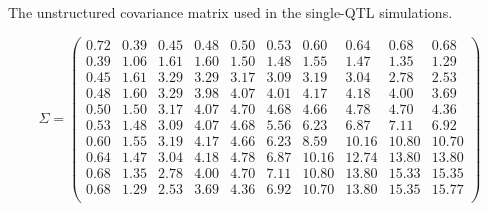 \documentclass[letterpaper,twoside]{article}
\begin{document}
\begin{table}[p]
\centering
  \caption{The unstructured covariance matrix used in the single-QTL simulations.}
\begin{equation*}
  \Sigma = \begin{pmatrix}
0.72 & 0.39 & 0.45 & 0.48 & 0.50 & 0.53 & 0.60 & 0.64 & 0.68 & 0.68 \\
0.39 & 1.06 & 1.61 & 1.60 & 1.50 & 1.48 & 1.55 & 1.47 & 1.35 & 1.29 \\
0.45 & 1.61 & 3.29 & 3.29 & 3.17 & 3.09 & 3.19 & 3.04 & 2.78 & 2.53 \\
0.48 & 1.60 & 3.29 & 3.98 & 4.07 & 4.01 & 4.17 & 4.18 & 4.00 & 3.69 \\
0.50 & 1.50 & 3.17 & 4.07 & 4.70 & 4.68 & 4.66 & 4.78 & 4.70 & 4.36 \\
0.53 & 1.48 & 3.09 & 4.07 & 4.68 & 5.56 & 6.23 & 6.87 & 7.11 & 6.92 \\
0.60 & 1.55 & 3.19 & 4.17 & 4.66 & 6.23 & 8.59 & 10.16 & 10.80 & 10.70 \\
0.64 & 1.47 & 3.04 & 4.18 & 4.78 & 6.87 & 10.16 & 12.74 & 13.80 & 13.80 \\
0.68 & 1.35 & 2.78 & 4.00 & 4.70 & 7.11 & 10.80 & 13.80 & 15.33 & 15.35 \\
0.68 & 1.29 & 2.53 & 3.69 & 4.36 & 6.92 & 10.70 & 13.80 & 15.35 & 15.77 \\
  \end{pmatrix}
\end{equation*}
\end{table}
\end{document}

